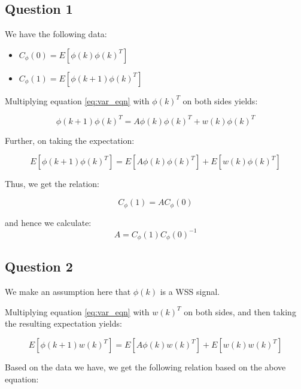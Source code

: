 \documentclass[12pt]{report}
\begin{document}
\subsection*{Question 1}

We have the following data:

\begin{itemize}
	\item $C_{\phi}(0) = E\left[\phi(k)\phi(k)^{T}\right]$
	\item $C_{\phi}(1) = E\left[\phi(k+1)\phi(k)^{T}\right]$
\end{itemize}

Multiplying equation \ref{eq:var_eqn} with $\phi(k)^{T}$ on both sides yields:

\begin{equation*}
\phi(k+1)\phi(k)^{T} = A\phi(k)\phi(k)^{T} + w(k)\phi(k)^{T}
\end{equation*}

Further, on taking the expectation:

\begin{equation*}
E\left[\phi(k+1)\phi(k)^{T}\right] = E\left[A\phi(k)\phi(k)^{T}\right] + E\left[w(k)\phi(k)^{T}\right]
\end{equation*}

Thus, we get the relation:

\begin{equation*}
	C_{\phi}(1) = AC_{\phi}(0)
\end{equation*}

and hence we calculate:
\begin{equation*}
	A = C_{\phi}(1)C_{\phi}(0)^{-1}
\end{equation*}


\subsection*{Question 2}

We make an assumption here that $\phi(k)$ is a WSS signal.

Multiplying equation \ref{eq:var_eqn} with $w(k)^{T}$ on both sides, and then taking the resulting expectation yields:

\begin{equation*}
E\left[\phi(k+1)w(k)^{T}\right] = E\left[A\phi(k)w(k)^{T}\right] + E\left[w(k)w(k)^{T}\right]
\end{equation*} 

Based on the data we have, we get the following relation based on the above equation:
\end{document}
